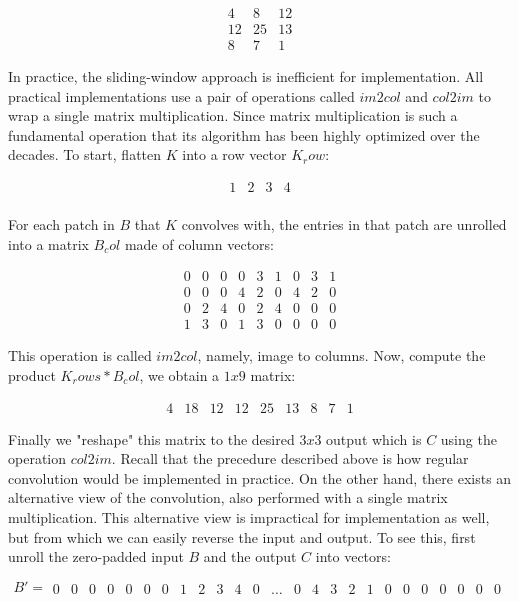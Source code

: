 $$
\begin{matrix}
  4 & 8 & 12 \\
  12 & 25 & 13 \\
  8 & 7 & 1
\end{matrix}
$$

In practice, the sliding-window approach is inefficient for implementation. All practical implementations
use a pair of operations called $im2col$ and $col2im$ to wrap a single matrix multiplication. Since
matrix multiplication is such a fundamental operation that its algorithm has been highly optimized over the
decades. To start, flatten $K$ into a row vector $K_row$:

$$
\begin{matrix}
  1 & 2 & 3 & 4 \\
\end{matrix}
$$

For each patch in $B$ that $K$ convolves with, the entries in that patch are unrolled into a matrix $B_col$
made of column vectors:

$$
\begin{matrix}
  0 & 0 & 0 & 0 & 3 & 1 & 0 & 3 & 1 \\
  0 & 0 & 0 & 4 & 2 & 0 & 4 & 2 & 0 \\
  0 & 2 & 4 & 0 & 2 & 4 & 0 & 0 & 0 \\
  1 & 3 & 0 & 1 & 3 & 0 & 0 & 0 & 0
\end{matrix}
$$

This operation is called $im2col$, namely, image to columns. Now, compute the product $K_rows * B_col$, we
obtain a $1x9$ matrix:

$$
\begin{matrix}
  4 & 18 & 12 & 12 & 25 & 13 & 8 & 7 & 1
\end{matrix}
$$

Finally we "reshape" this matrix to the desired $3x3$ output which is $C$ using the operation $col2im$.
Recall that the precedure described above is how regular convolution would be implemented in practice.
On the other hand, there exists an alternative view of the convolution, also performed with a single
matrix multiplication. This alternative view is impractical for implementation as well, but from which
we can easily reverse the input and output. To see this, first unroll the zero-padded input $B$ and the output
$C$ into vectors:

$$
B' =
\begin{matrix}
  0 & 0 & 0 & 0 & 0 & 0 & 0 & 1 & 2 & 3 & 4 & 0 & \dots & 0 & 4 & 3 & 2 & 1 & 0 & 0 & 0 & 0 & 0 & 0 & 0
\end{matrix}
$$

